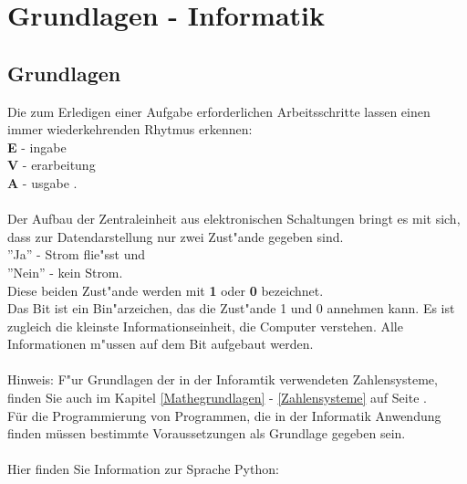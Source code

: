 \chapter{Grundlagen - Informatik}
\section{Grundlagen}
Die zum Erledigen einer Aufgabe erforderlichen Arbeitsschritte
lassen einen immer wiederkehrenden Rhytmus erkennen: \\
\textbf{E} - ingabe \\
\textbf{V} - erarbeitung \\
\textbf{A} - usgabe . \\
\\
Der Aufbau der Zentraleinheit aus elektronischen Schaltungen bringt
es mit sich, dass zur Datendarstellung nur zwei Zust"ande gegeben sind. \\
''Ja'' - Strom flie"sst und \\
''Nein'' - kein Strom. \\
Diese beiden Zust"ande werden mit \textbf{1} oder \textbf{0} bezeichnet.\\
Das Bit ist ein Bin"arzeichen, das die Zust"ande 1 und 0 annehmen kann.
Es ist zugleich die kleinste Informationseinheit, die Computer verstehen.
Alle Informationen m"ussen auf dem Bit aufgebaut werden.
\\
\\
Hinweis: F"ur Grundlagen der in der Inforamtik verwendeten Zahlensysteme,
finden Sie auch im Kapitel \ref{Mathegrundlagen} - \ref{Zahlensysteme}
auf Seite \pageref{Zahlensysteme} .
\\
Für die Programmierung von Programmen, die in der Informatik Anwendung finden
müssen bestimmte Voraussetzungen als Grundlage gegeben sein.\\
\\
Hier finden Sie Information zur Sprache Python:\\


